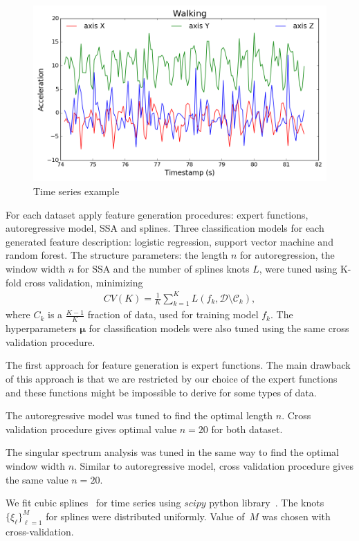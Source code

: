 \documentclass{llncs}
\begin{document}
\begin{figure}[h]
	\centering
	\includegraphics[width=1\linewidth]{ts_example.png}
	\caption{Time series example}
	\label{fig::ts_example}
\end{figure}

For each dataset apply feature generation procedures: expert functions, autoregressive model, SSA and splines. 
Three classification models for each generated feature description: logistic regression, support vector machine and random forest. 
The structure parameters: the length $n$ for autoregression, the window width $n$ for SSA and the number of splines knots $L$, were tuned using K-fold cross validation, minimizing
\begin{align}\label{cv}
CV(K) = \frac{1}{K}\sum_{k=1}^{K} L(f_k, \mathcal{D}\setminus \mathcal{C}_k),
\end{align}
where $C_k$ is a $\frac{K-1}{K}$ fraction of data, used for training model $f_k$.
The hyperparameters $\bm{\mu}$ for classification models were also tuned using the same cross validation procedure. 


The first approach for feature generation is expert functions. The main drawback of this approach is that we are restricted by our choice of the expert functions and these functions might be impossible to derive for some types of data.

The autoregressive model was tuned to find the optimal length $n$. Cross validation procedure gives optimal value $n=20$ for both dataset. 

The singular spectrum analysis was tuned in the same way to find the optimal window width $n$. Similar to autoregressive model, cross validation procedure gives the same value $n=20$.

We fit cubic splines~\cite{deboor1978splines} for time series using $scipy$ python library~\cite{scipy}. 
The knots $\{\xi_{\ell}\}_{\ell = 1}^M$ for splines were distributed uniformly. 
Value of~$M$ was chosen with cross-validation. 
\end{document}
